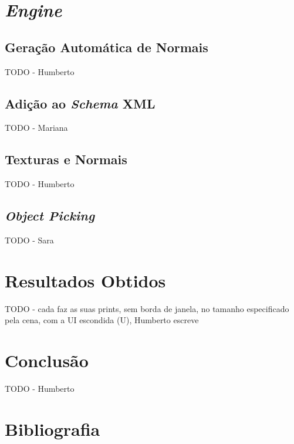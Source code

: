 \documentclass[12pt, a4paper]{article}
\begin{document}
\section{\emph{Engine}}

\subsection{Geração Automática de Normais}

{\color{red} TODO - Humberto}

\subsection{Adição ao \emph{Schema} XML}

{\color{red} TODO - Mariana}

\subsection{Texturas e Normais}

{\color{red} TODO - Humberto}

\subsection{\emph{Object Picking}}

{\color{red} TODO - Sara}

\section{Resultados Obtidos}

{\color{red} TODO - cada faz as suas prints, sem borda de janela, no tamanho especificado pela cena,
com a UI escondida (U), Humberto escreve}

\section{Conclusão}

{\color{red} TODO - Humberto}

\begingroup
\section{Bibliografia}
\renewcommand{\section}[2]{}

\begin{thebibliography}{9}
\end{thebibliography}
\endgroup
\end{document}
